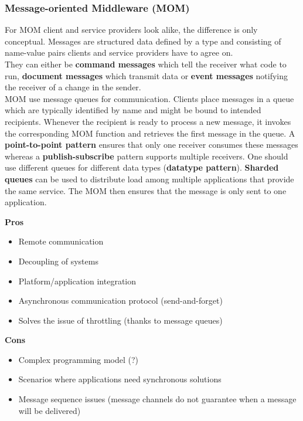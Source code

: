 \subsubsection{Message-oriented Middleware (MOM)}
For MOM client and service providers look alike, the difference is only conceptual.
Messages are structured data defined by a type and consisting of name-value pairs clients and service providers have to agree on.\\
They can either be \textbf{command messages} which tell the receiver what code to run, \textbf{document messages} which transmit data or \textbf{event messages} notifying the receiver of a change in the sender.\\
MOM use message queues for communication.
Clients place messages in a queue which are typically identified by name and might be bound to intended recipients.
Whenever the recipient is ready to process a new message, it invokes the corresponding MOM function and retrieves the first message in the queue.
A \textbf{point-to-point pattern} ensures that only one receiver consumes these messages whereas a \textbf{publish-subscribe} pattern supports multiple receivers.
One should use different queues for different data types (\textbf{datatype pattern}).
\textbf{Sharded queues} can be used to distribute load among multiple applications that provide the same service.
The MOM then ensures that the message is only sent to one application.\\
\begin{minipage}[t]{0.49\textwidth}
  \textbf{Pros}
  \begin{itemize}[topsep=0pt,noitemsep]
    \item Remote communication
    \item Decoupling of systems
    \item Platform/application integration
    \item Asynchronous communication protocol (send-and-forget)
    \item Solves the issue of throttling (thanks to message queues)
  \end{itemize}
\end{minipage}
\begin{minipage}[t]{0.49\textwidth}
  \textbf{Cons}
  \begin{itemize}[topsep=0pt, noitemsep]
    \item Complex programming model (?)
    \item Scenarios where applications need synchronous solutions
    \item Message sequence issues (message channels do not guarantee when a message will be delivered)
  \end{itemize}
\end{minipage}
\vspace{20pt}

